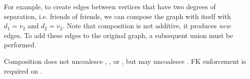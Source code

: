 For example, to create edges between vertices that have two degrees of
separation, i.e. friends of friends, we can compose the graph with
itself with $d_1=v_2$ and $d_2=v_2$.  Note that composition is not
additive, it produces {\em new} edges.  To add these edges to the
original graph, a subsequent union must be performed.  

Composition does not uncoalesce \tv, \te, or \tav, but may uncoalesce
\tae.  FK enforcement is required on \tav.




%
